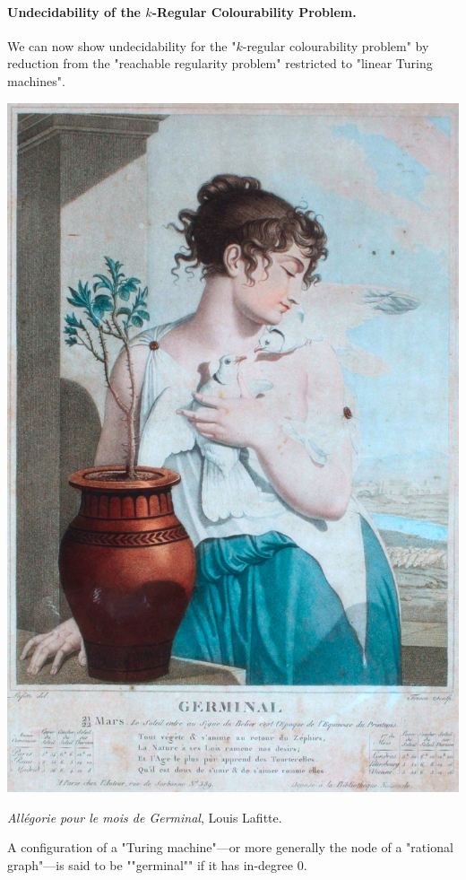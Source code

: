 \paragraph*{Undecidability of the $k$-Regular Colourability Problem.}
We can now show undecidability for the "$k$-regular colourability problem" by reduction from the "reachable regularity problem" restricted to "linear Turing machines".

\begin{marginfigure}
    \centering
    \includegraphics[width=\linewidth]{fig/germinal.jpg}
    \caption{\emph{Allégorie pour le mois de Germinal}, Louis Lafitte.}
\end{marginfigure}

A configuration of a "Turing machine"---or more generally the node of a "rational graph"---is said 
to be \AP""germinal"" if it has in-degree 0.

